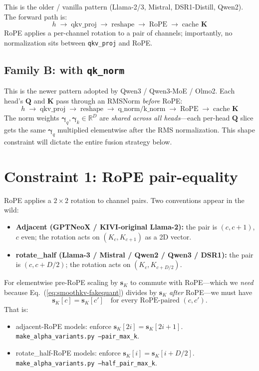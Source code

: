 \documentclass[11pt]{article}
\newcommand{\sk}{\mathbf{s}_K}
\newcommand{\K}{\mathbf{K}}
\newcommand{\Q}{\mathbf{Q}}
\begin{document}
This is the older / vanilla pattern (Llama-2/3, Mistral, DSR1-Distill,
Qwen2). The forward path is:
\begin{equation}
h \;\longrightarrow\; \mathrm{qkv\_proj}
   \;\longrightarrow\; \text{reshape}
   \;\longrightarrow\; \mathrm{RoPE}
   \;\longrightarrow\; \text{cache } \K
\label{eq:path-A}
\end{equation}
RoPE applies a per-channel rotation to a pair of channels; importantly,
no normalization sits between \texttt{qkv\_proj} and RoPE.

\subsection*{Family B: with \texttt{qk\_norm}}

This is the newer pattern adopted by Qwen3 / Qwen3-MoE / Olmo2. Each head's
$\Q$ and $\K$ pass through an RMSNorm \emph{before} RoPE:
\begin{equation}
h \;\longrightarrow\; \mathrm{qkv\_proj}
   \;\longrightarrow\; \text{reshape}
   \;\longrightarrow\; \mathrm{q\_norm} / \mathrm{k\_norm}
   \;\longrightarrow\; \mathrm{RoPE}
   \;\longrightarrow\; \text{cache } \K
\label{eq:path-B}
\end{equation}
The norm weights $\boldsymbol{\gamma}_q, \boldsymbol{\gamma}_k \in \mathbb{R}^{D}$
are \emph{shared across all heads}---each per-head $\Q$ slice gets the same
$\boldsymbol{\gamma}_q$ multiplied elementwise after the RMS normalization.
This shape constraint will dictate the entire fusion strategy below.

\section{Constraint 1: RoPE pair-equality}

RoPE applies a $2\!\times\!2$ rotation to channel pairs. Two conventions
appear in the wild:
\begin{itemize}
  \item \textbf{Adjacent (GPTNeoX / KIVI-original Llama-2):} the pair is
    $(c, c+1)$, $c$ even; the rotation acts on $(K_c, K_{c+1})$ as a 2D vector.
  \item \textbf{rotate\_half (Llama-3 / Mistral / Qwen2 / Qwen3 / DSR1):} the
    pair is $(c, c+D/2)$; the rotation acts on $(K_c, K_{c+D/2})$.
\end{itemize}

For elementwise pre-RoPE scaling by $\sk$ to commute with RoPE---which we
\emph{need} because Eq.~(\ref{eq:smoothkv-fakequant}) divides by $\sk$
\emph{after} RoPE---we must have
\begin{equation}
\sk[c] = \sk[c'] \quad \text{for every RoPE-paired }(c,c') .
\label{eq:pair-equal}
\end{equation}
That is:
\begin{itemize}
  \item adjacent-RoPE models: enforce $\sk[2i] = \sk[2i+1]$. \texttt{make\_alpha\_variants.py --pair\_max\_k}.
  \item rotate\_half-RoPE models: enforce $\sk[i] = \sk[i+D/2]$. \texttt{make\_alpha\_variants.py --half\_pair\_max\_k}.
\end{itemize}
\end{document}
